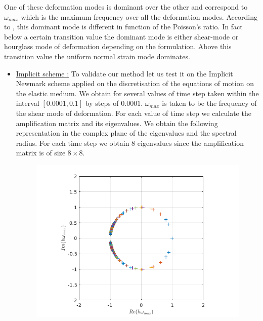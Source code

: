 One of these deformation modes is dominant over the other and correspond to $\omega_{max}$ which is the maximum frequency over all the deformation modes. 
According to \cite{Ling2002}, this dominant mode is different in function of the Poisson's ratio. In fact below a certain transition value the dominant mode is either shear-mode or hourglass mode of deformation depending on the formulation. Above this transition value the uniform normal strain mode dominates. \\
\begin{itemize}
\item \underline{Implicit scheme :} To validate our method let us test it on the Implicit Newmark scheme applied on the discretisation of the equations of motion on the elastic medium. We obtain for several values of time step taken within the interval $[0.0001, 0.1]$ by steps of $0.0001$. $\omega_{max}$ is taken to be the frequency of the shear mode of deformation. For each value of time step we calculate the amplification matrix and its eigenvalues. We obtain the following representation in the complex plane of the eigenvalues and the spectral radius. For each time step we obtain $8$ eigenvalues since the amplification matrix is of size $8 \times 8$.
\begin{figure}[H]
\centering
\begin{minipage}{.5\textwidth}
  \centering
  \includegraphics[width=.98\linewidth]{images/eig_med_imp.png}
  \label{fig:eig_med_imp}
\end{minipage}%
\begin{minipage}{.5\textwidth}

\end{minipage}
\end{figure}
\end{itemize}
